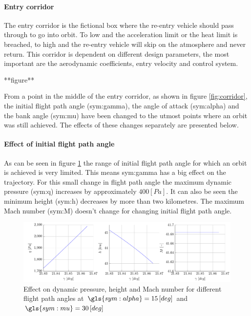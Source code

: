 \paragraph{Entry corridor}

The entry corridor is the fictional box where the re-entry vehicle should pass through to go into orbit. To low and the acceleration limit or the heat limit is breached, to high and the re-entry vehicle will skip on the atmosphere and never return. This corridor is dependent on different design parameters, the most important are the aerodynamic coefficients, entry velocity and control system.

**figure**

From a point in the middle of the entry corridor, as shown in figure \ref{fig:corridor}, the initial flight path angle (\gls{sym:gamma}), the angle of attack (\gls{sym:alpha}) and the bank angle (\gls{sym:mu}) have been changed to the utmost points where an orbit was still achieved. The effects of these changes separately are presented below.

\paragraph{Effect of initial flight path angle}

As can be seen in figure \ref{fig:effectgamma} the range of initial flight path angle for which an orbit is achieved is very limited. This means \gls{sym:gamma} has a big effect on the trajectory. For this small change in flight path angle the maximum dynamic pressure (\gls{sym:q}) increases by approximately $400 \left[Pa\right]$. It can also be seen the minimum height (\gls{sym:h}) decreases by more than two kilometres. The maximum Mach number (\gls{sym:M}) doesn't change for changing initial flight path angle.
\begin{figure}[h]
	\centering
	\includegraphics[width=\textwidth]{./Figure/orbit/effectgamma.pdf}
	\caption[Effect on dynamic pressure, height and Mach number for different flight path angles]{Effect on dynamic pressure, height and Mach number for different flight path angles at $\gls{sym:alpha}=15 \left[deg\right]$ and $\gls{sym:mu}=30 \left[deg\right]$}
	\label{fig:effectgamma}
\end{figure}

